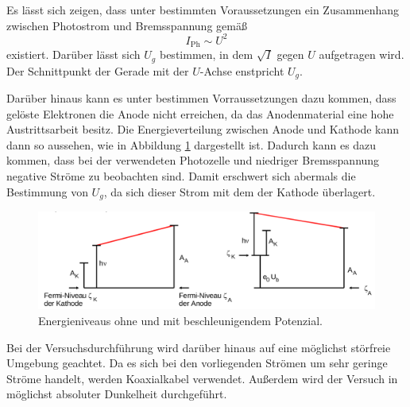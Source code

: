Es lässt sich zeigen, dass unter bestimmten Voraussetzungen ein Zusammenhang zwischen Photostrom und Bremsspannung gemäß
\begin{equation}
    I_{\text{Ph}}\sim U^2
\end{equation}
existiert.
Darüber lässt sich $U_g$ bestimmen, in dem $\sqrt{I}$ gegen $U$ aufgetragen wird. Der Schnittpunkt der Gerade mit der $U$-Achse enstpricht $U_g$.

Darüber hinaus kann es unter bestimmen Vorraussetzungen dazu kommen, dass gelöste Elektronen die Anode nicht erreichen, da das Anodenmaterial eine hohe Austrittsarbeit besitz. Die Energieverteilung zwischen Anode und Kathode kann dann so aussehen, wie in Abbildung \ref{fig:Energie} dargestellt ist.
Dadurch kann es dazu kommen, dass bei der verwendeten Photozelle und niedriger Bremsspannung negative Ströme zu beobachten sind. Damit erschwert sich abermals die Bestimmung von $U_g$, da sich dieser Strom mit dem der Kathode überlagert.

\begin{figure}
\centering
\includegraphics[width=\textwidth]{data/Energie.png}
\caption{Energieniveaus ohne und mit beschleunigendem Potenzial.}
\label{fig:Energie}
\end{figure}


Bei der Versuchsdurchführung wird darüber hinaus auf eine möglichst störfreie Umgebung geachtet. Da es sich bei den vorliegenden Strömen um sehr geringe Ströme handelt, werden Koaxialkabel verwendet. Außerdem wird der Versuch in möglichst absoluter Dunkelheit durchgeführt.














